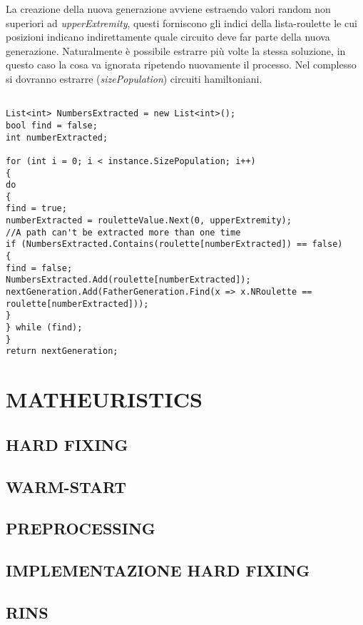 \documentclass[11pt]{article}
\begin{document}
La creazione della nuova generazione avviene estraendo valori random non superiori ad \textit{upperExtremity}, questi forniscono gli indici della lista-roulette le cui posizioni indicano indirettamente quale circuito deve far parte della nuova generazione. Naturalmente è possibile estrarre più volte la stessa soluzione, in questo caso la cosa va ignorata ripetendo nuovamente il processo. Nel complesso si dovranno estrarre (\textit{sizePopulation}) circuiti hamiltoniani.

\begin{lstlisting}

List<int> NumbersExtracted = new List<int>();
bool find = false;
int numberExtracted;

for (int i = 0; i < instance.SizePopulation; i++)
{
do
{
find = true;
numberExtracted = rouletteValue.Next(0, upperExtremity);
//A path can't be extracted more than one time
if (NumbersExtracted.Contains(roulette[numberExtracted]) == false)
{
find = false;
NumbersExtracted.Add(roulette[numberExtracted]);
nextGeneration.Add(FatherGeneration.Find(x => x.NRoulette == roulette[numberExtracted]));
}
} while (find);
}
return nextGeneration;

\end{lstlisting}

\section*{MATHEURISTICS}

\subsection*{HARD FIXING}

\subsection*{WARM-START}

\subsection*{PREPROCESSING}

\subsection*{IMPLEMENTAZIONE HARD FIXING}

\subsection*{RINS}
\end{document}
